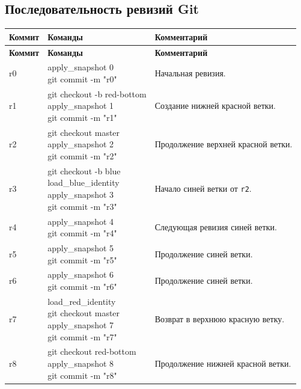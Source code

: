 \documentclass[12pt]{article}
\newcommand{\cmdcell}[1]{\parbox[t]{\linewidth}{\ttfamily\small\raggedright\strut #1\strut}}
\begin{document}
\subsection{Последовательность ревизий Git}

\begin{xltabular}{\linewidth}{|L{0.10\textwidth}|K|M|}
\hline
{}
\textbf{Коммит} & \textbf{Команды} & \textbf{Комментарий} \\
\hline
\endfirsthead
\hline
{}
\textbf{Коммит} & \textbf{Команды} & \textbf{Комментарий} \\
\hline
\endhead
r0 &
\cmdcell{apply\_snapshot 0\\
git commit -m "r0"} &
Начальная ревизия. \\
\hline
r1 &
\cmdcell{git checkout -b red-bottom\\
apply\_snapshot 1\\
git commit -m "r1"} &
Создание нижней красной ветки. \\
\hline
r2 &
\cmdcell{git checkout master\\
apply\_snapshot 2\\
git commit -m "r2"} &
Продолжение верхней красной ветки. \\
\hline
r3 &
\cmdcell{git checkout -b blue\\
load\_blue\_identity\\
apply\_snapshot 3\\
git commit -m "r3"} &
Начало синей ветки от \texttt{r2}. \\
\hline
r4 &
\cmdcell{apply\_snapshot 4\\
git commit -m "r4"} &
Следующая ревизия синей ветки. \\
\hline
r5 &
\cmdcell{apply\_snapshot 5\\
git commit -m "r5"} &
Продолжение синей ветки. \\
\hline
r6 &
\cmdcell{apply\_snapshot 6\\
git commit -m "r6"} &
Продолжение синей ветки. \\
\hline
r7 &
\cmdcell{load\_red\_identity\\
git checkout master\\
apply\_snapshot 7\\
git commit -m "r7"} &
Возврат в верхнюю красную ветку. \\
\hline
r8 &
\cmdcell{git checkout red-bottom\\
apply\_snapshot 8\\
git commit -m "r8"} &
Продолжение нижней красной ветки. \\

\end{xltabular}
\end{document}
